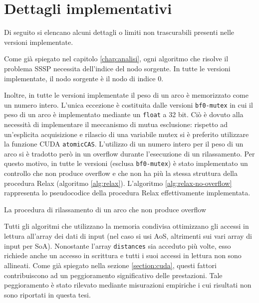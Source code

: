 \documentclass[12pt,a4paper,oneside]{book}
\begin{document}
	\section{Dettagli implementativi}
	\label{section:impl}
	Di seguito si elencano alcuni dettagli o limiti non trascurabili presenti nelle versioni implementate.
	
	Come già spiegato nel capitolo \ref{chap:analisi}, ogni algoritmo che risolve il problema SSSP necessita dell'indice del nodo sorgente. In tutte le versioni implementate, il nodo sorgente è il nodo di indice $0$.
	
	Inoltre, in tutte le versioni implementate il peso di un arco è memorizzato come un numero intero. L'unica eccezione è costituita dalle versioni \texttt{bf0-mutex} in cui il peso di un arco è implementato mediante un \texttt{float} a 32 bit. Ciò è dovuto alla necessità di implementare il meccanismo di mutua esclusione: rispetto ad un'esplicita acquisizione e rilascio di una variabile mutex si è preferito utilizzare la funzione CUDA \texttt{atomicCAS}. L'utilizzo di un numero intero per il peso di un arco si è tradotto però in un overflow durante l'esecuzione di un rilassamento. Per questo motivo, in tutte le versioni (esclusa \texttt{bf0-mutex}) è stato implementato un controllo che non produce overflow e che non ha più la stessa struttura della procedura Relax (algoritmo \ref{alg:relax}). L'algoritmo \ref{alg:relax-no-overflow} rappresenta lo pseudocodice della procedura Relax effettivamente implementata.
	
	\begin{algorithm}
		\caption{La procedura di rilassamento di un arco che non produce overflow}
		\label{alg:relax-no-overflow}
	\end{algorithm}

	Tutti gli algoritmi che utilizzano la memoria condivisa ottimizzano gli accessi in lettura all'array dei dati di input (nel caso si usi AoS, altrimenti sui vari array di input per SoA). Nonostante l'array \texttt{distances} sia acceduto più volte, esso richiede anche un accesso in scrittura e tutti i suoi accessi in lettura non sono allineati. Come già spiegato nella sezione \ref{section:cuda}, questi fattori contribuiscono ad un peggioramento significativo delle prestazioni. Tale peggioramento è stato rilevato mediante misurazioni empiriche i cui risultati non sono riportati in questa tesi.
	
\end{document}
